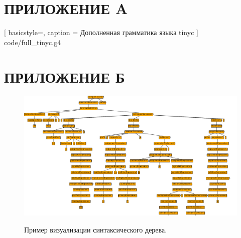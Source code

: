 \section*{ПРИЛОЖЕНИЕ A}\label{sec:app-A}


[
    basicstyle=\tiny,
    caption = Дополненная грамматика языка tinyc \label{lst:grammar}
]
{code/full_tinyc.g4}
\pagebreak

\section*{ПРИЛОЖЕНИЕ Б}\label{sec:app-B}
\begin{figure}[h!]
	\begin{center}
		{\includegraphics[width=0.85\textheight, angle = 90]{img/div7.pdf}}
		\caption{Пример визуализации синтаксического дерева.}
		\label{div7:tree}
	\end{center}
\end{figure}
